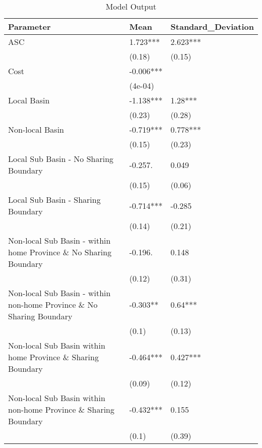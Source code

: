\begin{table}[ht]
\centering
\begin{tabular}{lll}
  \hline
Parameter & Mean & Standard\_Deviation \\ 
  \hline
ASC & 1.723*** & 2.623*** \\ 
   & (0.18) & (0.15) \\ 
  Cost & -0.006*** &  \\ 
   & (4e-04) &  \\ 
  Local Basin & -1.138*** & 1.28*** \\ 
   & (0.23) & (0.28) \\ 
  Non-local Basin & -0.719*** & 0.778*** \\ 
   & (0.15) & (0.23) \\ 
  Local Sub Basin - No Sharing Boundary & -0.257. & 0.049 \\ 
   & (0.15) & (0.06) \\ 
  Local Sub Basin - Sharing Boundary & -0.714*** & -0.285 \\ 
   & (0.14) & (0.21) \\ 
  Non-local Sub Basin - within home Province \& No Sharing Boundary & -0.196. & 0.148 \\ 
   & (0.12) & (0.31) \\ 
  Non-local Sub Basin - within non-home Province \& No Sharing Boundary & -0.303** & 0.64*** \\ 
   & (0.1) & (0.13) \\ 
  Non-local Sub Basin within home Province \& Sharing Boundary & -0.464*** & 0.427*** \\ 
   & (0.09) & (0.12) \\ 
  Non-local Sub Basin within non-home Province \& Sharing Boundary & -0.432*** & 0.155 \\ 
   & (0.1) & (0.39) \\ 
   \hline
\end{tabular}
\caption{Model Output} 
\end{table}

